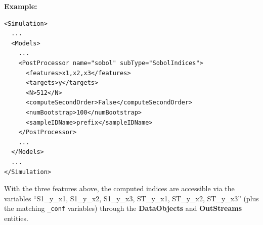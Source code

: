 %
\textbf{Example:}
\begin{lstlisting}[style=XML,morekeywords={name,subType}]
<Simulation>
  ...
  <Models>
    ...
    <PostProcessor name="sobol" subType="SobolIndices">
      <features>x1,x2,x3</features>
      <targets>y</targets>
      <N>512</N>
      <computeSecondOrder>False</computeSecondOrder>
      <numBootstrap>100</numBootstrap>
      <sampleIDName>prefix</sampleIDName>
    </PostProcessor>
    ...
  </Models>
  ...
</Simulation>
\end{lstlisting}
%
With the three features above, the computed indices are accessible via the
variables ``S1\_y\_x1, S1\_y\_x2, S1\_y\_x3, ST\_y\_x1, ST\_y\_x2, ST\_y\_x3''
(plus the matching \texttt{\_conf} variables) through the \textbf{DataObjects}
and \textbf{OutStreams} entities.
